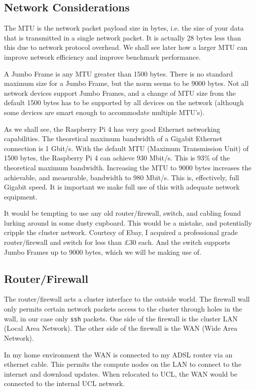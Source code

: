 \documentclass{report}
\begin{document}
%
%
\subsection{Network Considerations}

The MTU is the network packet payload size in bytes, i.e. the size of your data that is transmitted in a single network packet. It is actually 28 bytes less than this due to network protocol overhead. We shall see later how a larger MTU can improve network efficiency and improve benchmark performance.

A Jumbo Frame is any MTU greater than 1500 bytes. There is no standard maximum size for a Jumbo Frame, but the norm seems to be 9000 bytes. Not all network devices support Jumbo Frames, and a change of MTU size from the default 1500 bytes has to be supported by all devices on the network (although some devices are smart enough to accommodate multiple MTU's).

As we shall see, the Raspberry Pi 4 has very good Ethernet networking capabilities. The theoretical maximum bandwidth of a Gigabit Ethernet connection is 1 Gbit/s. With the default MTU (Maximum Transmission Unit) of 1500 bytes, the Raspberry Pi 4 can achieve 930 Mbit/s. This is 93\% of the theoretical maximum bandwidth. Increasing the MTU to 9000 bytes increases the achievable, and measurable, bandwidth to 980 Mbit/s. This is, effectively, full Gigabit speed. It is important we make full use of this with adequate network equipment.

It would be tempting to use any old router/firewall, switch, and cabling found lurking around in some dusty cupboard. This would be a mistake, and potentially cripple the cluster network. Courtesy of Ebay, I acquired a professional grade router/firewall and switch for less than £30 each. And the switch supports Jumbo Frames up to 9000 bytes, which we will be making use of.


%
%
\subsection{Router/Firewall}
The router/firewall acts a cluster interface to the outside world. The firewall wall only permits certain network packets access to the cluster through holes in the wall, in our case only \verb|ssh| packets. One side of the firewall is the cluster LAN (Local Area Network). The other side of the firewall is the WAN (Wide Area Network). 

In my home environment the WAN is connected to my ADSL router via an ethernet cable. This permits the compute nodes on the LAN to connect to the internet and download updates. When relocated to UCL, the WAN would be connected to the internal UCL network.
\end{document}
